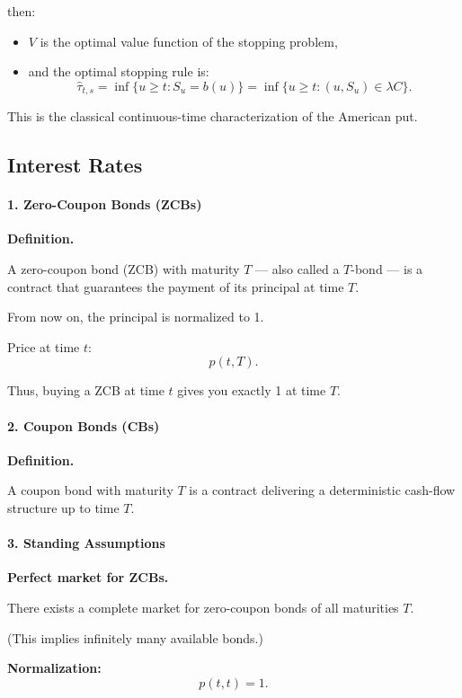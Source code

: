\documentclass[12pt,a4paper]{article}
\theoremstyle{definition}
\begin{document}
then:

\begin{itemize}
\item $V$ is the optimal value function of the stopping problem,

\item and the optimal stopping rule is:
\[
\hat{\tau}_{t,s} = \inf\{u \geq t : S_u = b(u)\} = \inf\{u \geq t : (u, S_u) \in \lambda C\}.
\]
\end{itemize}

This is the classical continuous-time characterization of the American put.

\subsection{Interest Rates}

\paragraph{1. Zero-Coupon Bonds (ZCBs)}

\textbf{Definition.}

A zero-coupon bond (ZCB) with maturity $T$ --- also called a $T$-bond --- is a contract that guarantees the payment of its principal at time $T$.

From now on, the principal is normalized to 1.

Price at time $t$:
\[
p(t, T).
\]

Thus, buying a ZCB at time $t$ gives you exactly 1 at time $T$.

\paragraph{2. Coupon Bonds (CBs)}

\textbf{Definition.}

A coupon bond with maturity $T$ is a contract delivering a deterministic cash-flow structure up to time $T$.

\paragraph{3. Standing Assumptions}

\textbf{Perfect market for ZCBs.}

There exists a complete market for zero-coupon bonds of all maturities $T$.

(This implies infinitely many available bonds.)

\textbf{Normalization:}
\[
p(t, t) = 1.
\]
\end{document}
